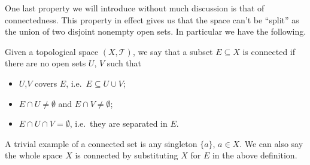 One last property we will introduce without much discussion is that of
connectedness. This property in effect gives us that the space can't
be ``split'' as the union of two disjoint nonempty open sets. In
particular we have the following.

\begin{defn}
  Given a topological space $(X,\mathscr{T})$, we say that a subset $E
  \subseteq X$ is connected if there are no open sets $U$, $V$ such that
  \begin{itemize}
  \item $U$,$V$ covers $E$, i.e.\ $E \subseteq U \cup V$;
  \item $E \cap U \not= \emptyset$ and $E \cap V \not= \emptyset$;
  \item $E \cap U \cap V = \emptyset$, i.e.\ they are separated in
    $E$.
  \end{itemize}
\end{defn}

A trivial example of a connected set is any singleton $\{a \}$, $a \in
X$. We can also say the whole space $X$ is connected by substituting
$X$ for $E$ in the above definition.

